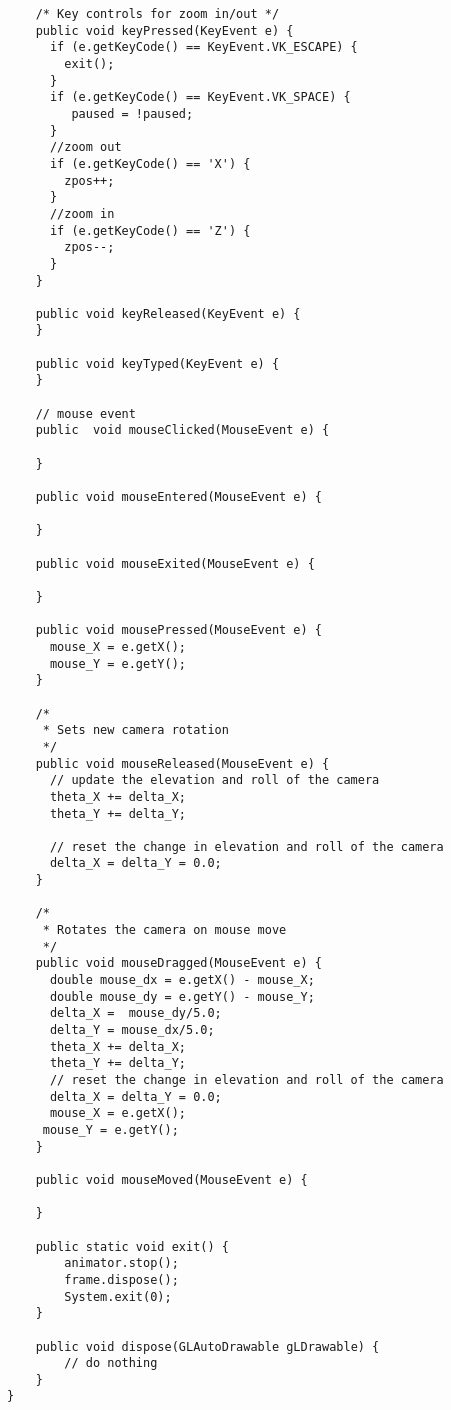 \begin{lstlisting}
	/* Key controls for zoom in/out */
    public void keyPressed(KeyEvent e) {
	  if (e.getKeyCode() == KeyEvent.VK_ESCAPE) {
	    exit();
	  }
	  if (e.getKeyCode() == KeyEvent.VK_SPACE) {
	     paused = !paused;
	  }
	  //zoom out
	  if (e.getKeyCode() == 'X') {
	    zpos++;
	  }
	  //zoom in
	  if (e.getKeyCode() == 'Z') {
	    zpos--;
	  }
    }
 
    public void keyReleased(KeyEvent e) {
    }
 
    public void keyTyped(KeyEvent e) {
    }
	
    // mouse event
    public  void mouseClicked(MouseEvent e) {
	
    }
	
    public void	mouseEntered(MouseEvent e) {
	
    }
	
    public void	mouseExited(MouseEvent e) {
	
    }
	
    public void	mousePressed(MouseEvent e) {
	  mouse_X = e.getX();
	  mouse_Y = e.getY();
    }
	
	/*
	 * Sets new camera rotation 
	 */
    public void	mouseReleased(MouseEvent e) {
	  // update the elevation and roll of the camera
	  theta_X += delta_X;
	  theta_Y += delta_Y;
				
	  // reset the change in elevation and roll of the camera
	  delta_X = delta_Y = 0.0;
    }
	
	/*
	 * Rotates the camera on mouse move 
	 */
    public void	mouseDragged(MouseEvent e) {
	  double mouse_dx = e.getX() - mouse_X;
	  double mouse_dy = e.getY() - mouse_Y;
	  delta_X =  mouse_dy/5.0;
	  delta_Y = mouse_dx/5.0;
	  theta_X += delta_X;
	  theta_Y += delta_Y;
	  // reset the change in elevation and roll of the camera
	  delta_X = delta_Y = 0.0;
	  mouse_X = e.getX();
	 mouse_Y = e.getY();
    }
	
    public void	mouseMoved(MouseEvent e) {
		
    }
	 
    public static void exit() {
        animator.stop();
        frame.dispose();
        System.exit(0);
    }
 
    public void dispose(GLAutoDrawable gLDrawable) {
        // do nothing
    }
}\end{lstlisting}

